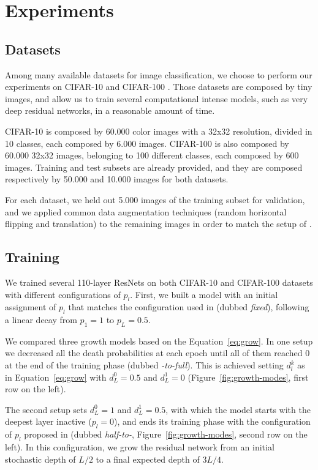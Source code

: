 \documentclass{sig-alternate}
\begin{document}
\section{Experiments}
\subsection{Datasets}

Among many available datasets for image classification, we choose to perform our experiments on CIFAR-10 and CIFAR-100 \cite{krizhevsky2009learning}. 
Those datasets are composed by tiny images, and allow us to train several computational intense models, such as very deep residual networks, in a reasonable amount of time.

CIFAR-10 is composed by 60.000 color images with a 32x32 resolution, divided in 10 classes, each composed by 6.000 images. 
CIFAR-100 is also composed by 60.000 32x32 images, belonging to 100 different classes, each composed by 600 images. 
Training and test subsets are already provided, and they are composed respectively by 50.000 and 10.000 images for both datasets.

For each dataset, we held out 5.000 images of the training subset for validation, and we applied common data augmentation techniques (random horizontal flipping and translation) to the remaining images in order to match the setup of \cite{huang2016deep}.

\subsection{Training}

We trained several 110-layer ResNets on both CIFAR-10 and CIFAR-100 datasets with different configurations of $p_l$.
First, we built a model with an initial assignment of $p_l$ that matches the configuration used in \cite{huang2016deep} (dubbed \emph{fixed}), following a linear decay from $p_1 = 1$ to $p_L = 0.5$.

We compared three growth models based on the Equation~\ref{eq:grow}.
In one setup we decreased all the death probabilities at each epoch until all of them reached $0$  at the end of the training phase (dubbed \emph{\cite{huang2016deep}-to-full}). 
This is achieved setting $d_l^k$ as in Equation~\ref{eq:grow} with $d_L^0 = 0.5$ and $d_L^1 = 0$ (Figure~\ref{fig:growth-modes}, first row on the left).

The second setup sets $d_L^0 = 1$ and $d_L^1 = 0.5$, with which the model starts with the deepest layer inactive ($p_l = 0$), and ends its training phase with the configuration of $p_l$ proposed in \cite{huang2016deep} (dubbed \emph{half-to-\cite{huang2016deep}}, Figure~\ref{fig:growth-modes}, second row on the left). 
In this configuration, we grow the residual network from an initial stochastic depth of $L / 2$ to a final expected depth of $3L / 4$.
\end{document}
